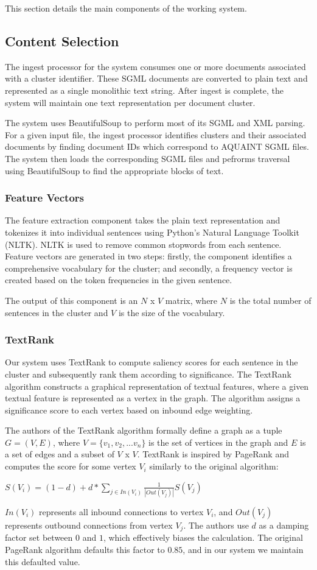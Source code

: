\documentclass[11pt]{article}
\begin{document}
This section details the main components of the working system.

\subsection{Content Selection}
The ingest processor for the system consumes one or more documents associated with a cluster identifier. These SGML documents are converted to plain text and represented as a single monolithic text string. After ingest is complete, the system will maintain one text representation per document cluster.

The system uses BeautifulSoup to perform most of its SGML and XML parsing. For a given input file, the ingest processor identifies clusters and their associated documents by finding document IDs which correspond to AQUAINT SGML files. The system then loads the corresponding SGML files and pefrorms traversal using BeautifulSoup to find the appropriate blocks of text.
\subsubsection{Feature Vectors}
The feature extraction component takes the plain text representation and tokenizes it into individual sentences using Python's Natural Language Toolkit (NLTK). NLTK is used to remove common stopwords from each sentence. Feature vectors are generated in two steps: firstly, the component identifies a comprehensive vocabulary for the cluster; and secondly, a frequency vector is created based on the token frequencies in the given sentence. 

The output of this component is an $N$ x $V$ matrix, where $N$ is the total number of sentences in the cluster and $V$ is the size of the vocabulary. 
\subsubsection{TextRank}
Our system uses TextRank to compute saliency scores for each sentence in the cluster and subsequently rank them according to significance. The TextRank algorithm constructs a graphical representation of textual features, where a given textual feature is represented as a vertex in the graph. The algorithm assigns a significance score to each vertex based on inbound edge weighting.

The authors of the TextRank algorithm formally define a graph as a tuple $G = (V,E)$, where $V = \{v_1, v_2, ... v_n\}$ is the set of vertices in the graph and $E$ is a set of edges and a subset of $V$ x $V$. TextRank is inspired by PageRank and computes the score for some vertex $V_i$ similarly to the original algorithm:
\begin{center}
    $S(V_i) = (1 - d) + d * \sum_{j \in In(V_i)} \frac{1}{|Out(V_j)|}S(V_j)$
\end{center}
$In(V_i)$ represents all inbound connections to vertex $V_i$, and $Out(V_j)$ represents outbound connections from vertex $V_j$. The authors use $d$ as a damping factor set between $0$ and $1$, which effectively biases the calculation. The original PageRank algorithm defaults this factor to $0.85$, and in our system we maintain this defaulted value.
\end{document}
